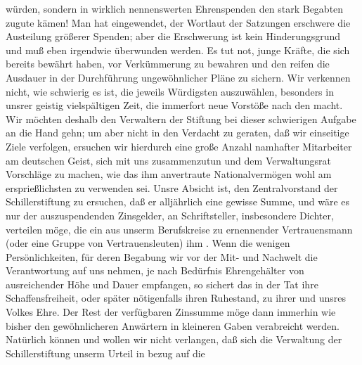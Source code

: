 \begin{ledgroupsized}[t]{13cm}
               würden, sondern in wirklich nennenswerten Ehrenspenden den stark Begabten zugute
               kämen! Man hat eingewendet, der Wortlaut der Satzungen erschwere die Austeilung
               größerer Spenden; aber die Erschwerung ist kein Hinderungsgrund und muß eben
               irgendwie überwunden werden. Es tut not, junge Kräfte, die sich bereits bewährt
               haben, vor Verkümmerung zu bewahren und den reifen die Ausdauer in der Durchführung
               ungewöhnlicher Pläne zu sichern.\pend
           \pstart
           Wir verkennen nicht, wie schwierig es ist, die jeweils Würdigsten auszuwählen,
               besonders in unsrer geistig vielspältigen Zeit, die immerfort neue Vorstöße nach den
                   macht. Wir möchten deshalb
               den Verwaltern der Stiftung bei
               dieser schwierigen Aufgabe an die Hand gehn; um aber nicht in den Verdacht zu
               geraten, daß wir einseitige Ziele verfolgen, ersuchen wir hierdurch eine große Anzahl
               namhafter Mitarbeiter am deutschen Geist, sich mit uns zusammenzutun und dem
               Verwaltungsrat Vorschläge zu {\pb}machen, wie das ihm
               anvertraute Nationalvermögen wohl am ersprießlichsten zu verwenden sei.\pend
           \pstart
           Unsre Absicht ist, den Zentralvorstand der Schillerstiftung zu ersuchen, daß er alljährlich eine gewisse Summe, und
               wäre es nur  der auszuspendenden Zinsgelder, an
                   Schriftsteller, insbesondere Dichter,
               verteilen möge, die ein aus unserm Berufskreise zu ernennender Vertrauensmann (oder
               eine Gruppe von Vertrauensleuten) ihm . Wenn die wenigen Persönlichkeiten, für deren Begabung wir vor der Mit-
               und Nachwelt die Verantwortung auf uns nehmen, je nach Bedürfnis Ehrengehälter von
               ausreichender Höhe und Dauer empfangen, so sichert das in der Tat ihre
               Schaffensfreiheit, oder später nötigenfalls ihren Ruhestand, zu ihrer und unsres
               Volkes Ehre. Der Rest der verfügbaren Zinssumme möge dann immerhin wie bisher den
               gewöhnlicheren Anwärtern in kleineren Gaben verabreicht werden.\pend
           \pstart
           Natürlich können und wollen wir nicht verlangen, daß sich die Verwaltung der Schillerstiftung unserm Urteil in bezug auf die

\end{ledgroupsized}
